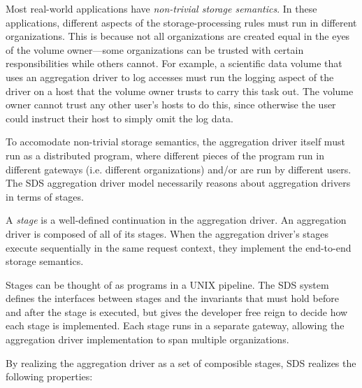 Most real-world applications have \emph{non-trivial storage semantics}.  In these
applications, different aspects of the storage-processing rules must run in different
organizations.  This is because not all organizations are created equal in the
eyes of the volume owner---some
organizations can be trusted with certain responsibilities while others cannot.
For example, a scientific data volume that uses an aggregation
driver to log accesses must run the logging aspect of the driver on a host that the volume
owner trusts to carry this task out.  The volume owner cannot trust any other
user's hosts to do this, since otherwise the user could instruct their host
to simply omit the log data.

To accomodate non-trivial storage semantics, the aggregation driver itself must
run as a distributed program, where different pieces of the program run in
different gateways (i.e. different organizations) and/or are run by different
users.  The SDS aggregation driver model necessarily reasons about aggregation
drivers in terms of stages.

A \emph{stage} is a well-defined continuation in the aggregation driver.  An
aggregation driver is composed of all of its stages.  When
the aggregation driver's stages execute sequentially in the same request
context, they implement the end-to-end storage semantics.

Stages can be thought of as programs in a UNIX pipeline.
The SDS system defines the interfaces between stages
and the invariants that must hold before and after the stage is executed,
but gives the developer free reign to decide how each stage is implemented.
Each stage runs in a separate gateway, allowing the aggregation driver
implementation to span multiple organizations.

By realizing the aggregation driver as a set of composible stages, SDS realizes
the following properties:

